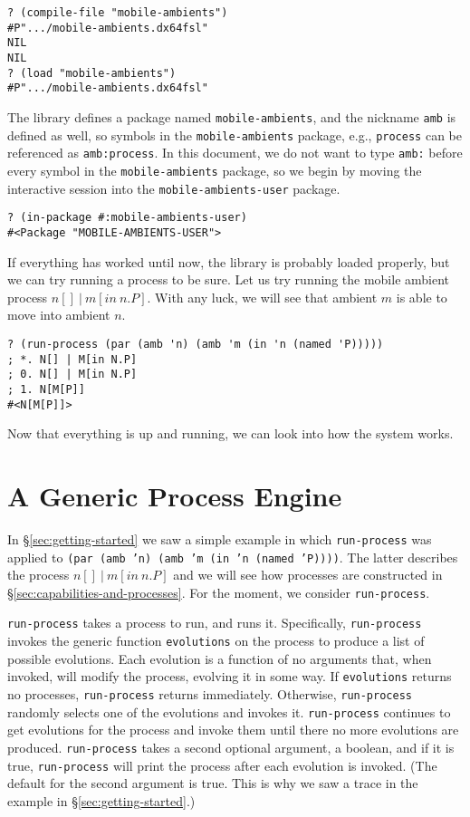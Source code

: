\documentclass[12pt]{article}
\begin{document}
\begin{verbatim}
? (compile-file "mobile-ambients")
#P".../mobile-ambients.dx64fsl"
NIL
NIL
? (load "mobile-ambients")
#P".../mobile-ambients.dx64fsl"
\end{verbatim}

The library defines a package named \texttt{mobile-ambients}, and the nickname \texttt{amb} is defined as well, so symbols in the \texttt{mobile-ambients} package, e.g., \texttt{process} can be referenced as \texttt{amb:process}.
In this document, we do not want to type \texttt{amb:} before every symbol in the \texttt{mobile-ambients} package, so we begin by moving the interactive session into the \texttt{mobile-ambients-user} package.

\begin{verbatim}
? (in-package #:mobile-ambients-user)
#<Package "MOBILE-AMBIENTS-USER">
\end{verbatim}

If everything has worked until now, the library is probably loaded properly, but we can try running a process to be sure.
Let us try running the mobile ambient process $n[]\ |\ m[\mathit{in}\ n.P]$.
With any luck, we will see that ambient $m$ is able to move into ambient $n$.

\begin{verbatim}
? (run-process (par (amb 'n) (amb 'm (in 'n (named 'P)))))
; *. N[] | M[in N.P]
; 0. N[] | M[in N.P]
; 1. N[M[P]]
#<N[M[P]]>
\end{verbatim}

Now that everything is up and running, we can look into how the system works.

\section{A Generic Process Engine}
\label{sec:generic-process-engine}

In \S\ref{sec:getting-started} we saw a simple example in which \texttt{run-process} was applied to \texttt{(par (amb 'n) (amb 'm (in 'n (named 'P))))}.
The latter describes the process $n[]\ |\ m[\mathit{in}\ n.P]$ and we will see how processes are constructed in \S\ref{sec:capabilities-and-processes}.
For the moment, we consider \texttt{run-process}.

\texttt{run-process} takes a process to run, and runs it.
Specifically, \texttt{run-process} invokes the generic function \texttt{evolutions} on the process to produce a list of possible evolutions.
Each evolution is a function of no arguments that, when invoked, will modify the process, evolving it in some way.
If \texttt{evolutions} returns no processes, \texttt{run-process} returns immediately.
Otherwise, \texttt{run-process} randomly selects one of the evolutions and invokes it.
\texttt{run-process} continues to get evolutions for the process and invoke them until there no more evolutions are produced.
\texttt{run-process} takes a second optional argument, a boolean, and if it is true, \texttt{run-process} will print the process after each evolution is invoked.
(The default for the second argument is true.
This is why we saw a trace in the example in \S\ref{sec:getting-started}.)
\end{document}
